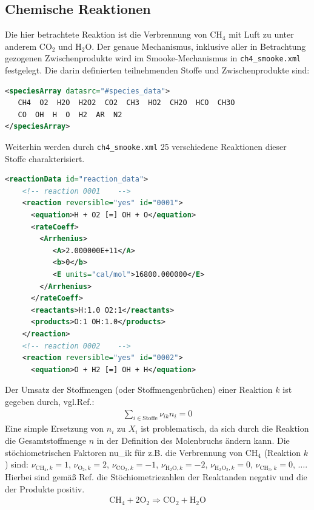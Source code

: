 \subsection{Chemische Reaktionen}
\label{sct:chemreact}

Die hier betrachtete Reaktion ist die Verbrennung von $\mathrm{CH}_4$ mit Luft zu unter anderem $\mathrm{CO}_2$ und $\mathrm{H}_2\mathrm{O}$. Der genaue Mechanismus, inklusive aller in Betrachtung gezogenen Zwischenprodukte wird im Smooke-Mechanismus in \lstinline!ch4_smooke.xml! festgelegt. Die darin definierten teilnehmenden Stoffe und Zwischenprodukte sind:
\begin{lstlisting}[language=xml,label=lst:ch4smooke,caption={Auszug aus \lstinline!ch4_smooke.xml!}]
<speciesArray datasrc="#species_data">
   CH4  O2  H2O  H2O2  CO2  CH3  HO2  CH2O  HCO  CH3O
   CO  OH  H  O  H2  AR  N2
</speciesArray>
\end{lstlisting}
Weiterhin werden durch \lstinline!ch4_smooke.xml! 25 verschiedene Reaktionen dieser Stoffe charakterisiert.
\begin{lstlisting}[language=xml,caption={Auszug aus \lstinline!ch4_smooke.xml!}]
  <reactionData id="reaction_data">
    <!-- reaction 0001    -->
    <reaction reversible="yes" id="0001">
      <equation>H + O2 [=] OH + O</equation>
      <rateCoeff>
        <Arrhenius>
           <A>2.000000E+11</A>
           <b>0</b>
           <E units="cal/mol">16800.000000</E>
        </Arrhenius>
      </rateCoeff>
      <reactants>H:1.0 O2:1</reactants>
      <products>O:1 OH:1.0</products>
    </reaction>
    <!-- reaction 0002    -->
    <reaction reversible="yes" id="0002">
      <equation>O + H2 [=] OH + H</equation>
\end{lstlisting}
Der Umsatz der Stoffmengen (oder Stoffmengenbrüchen) einer Reaktion $k$ ist gegeben durch, vgl.Ref.\cite[32]{hasse-pdf02}:
\begin{align}
    \sum\limits_{i\in\text{Stoffe}} \nu_{ik} n_i = 0
\end{align}
Eine simple Ersetzung von $n_i$ zu $X_i$ ist problematisch, da sich durch die Reaktion die Gesamtstoffmenge $n$ in der Definition des Molenbruchs ändern kann. Die stöchiometrischen Faktoren \gls{nu_ik} für z.B. die Verbrennung von $\mathrm{CH}_4$ (Reaktion $k$) sind:
$\nu_{\mathrm{CH}_4           ,k}= 1$,
$\nu_{\mathrm{O}_2            ,k}= 2$,
$\nu_{\mathrm{CO}_2           ,k}=-1$,
$\nu_{\mathrm{H}_2\mathrm{O}  ,k}=-2$,
$\nu_{\mathrm{H}_2\mathrm{O}_2,k}= 0$,
$\nu_{\mathrm{CH}_3           ,k}= 0$,
$\ldots$. Hierbei sind gemäß Ref.\cite[187]{iupacreactionglossary} die Stöchiometriezahlen der Reaktanden negativ und die der Produkte positiv.
\begin{align}
    \label{eq:ch4+o2}
    \mathrm{CH}_4 + 2 \mathrm{O}_2 \Rightarrow \mathrm{CO}_2 + \mathrm{H}_2\mathrm{O}
\end{align}

